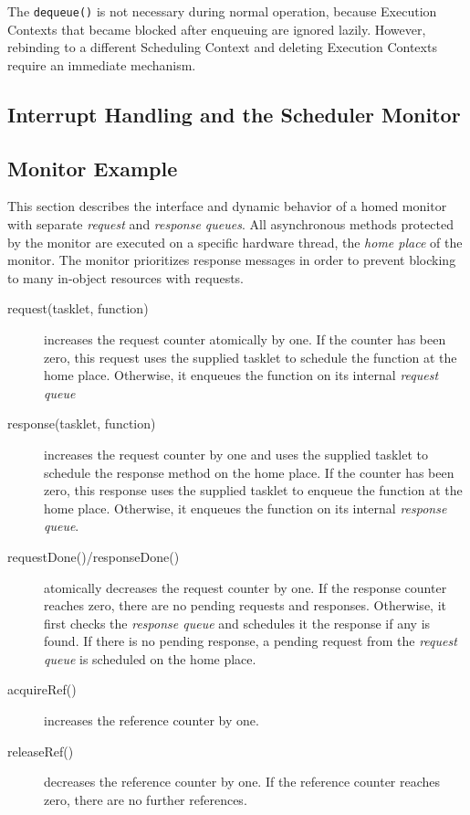 The \texttt{dequeue()} is not necessary during normal operation, because Execution Contexts that became blocked after enqueuing are ignored lazily. However, rebinding to a different Scheduling Context and deleting Execution Contexts require an immediate mechanism.


\subsection{Interrupt Handling and the Scheduler Monitor}


\subsection{Monitor Example}


This section describes the interface and dynamic behavior of a homed monitor with separate \emph{request} and \emph{response queues}. All asynchronous methods protected by the monitor are executed on a specific hardware thread, the \emph{home place} of the monitor. The monitor prioritizes response messages in order to prevent blocking to many in-object resources with requests.

\begin{description}
\item[request(tasklet, function)] increases the request counter atomically by one. If the counter has been zero, this request uses the supplied tasklet to schedule the function at the home place. Otherwise, it enqueues the function on its internal \emph{request queue}
\item[response(tasklet, function)] increases the request counter by one and uses the supplied tasklet to schedule the response method on the home place. If the counter has been zero, this response uses the supplied tasklet to enqueue the function at the home place. Otherwise, it enqueues the function on its internal \emph{response queue}.
\item[requestDone()/responseDone()] atomically decreases the request counter by one. If the response counter reaches zero, there are no pending requests and responses. Otherwise, it first checks the \emph{response queue} and schedules it the response if any is found. If there is no pending response, a pending request from the \emph{request queue} is scheduled on the home place.
\item[acquireRef()] increases the reference counter by one.
\item[releaseRef()] decreases the reference counter by one. If the reference counter reaches zero, there are no further references.
\end{description}

